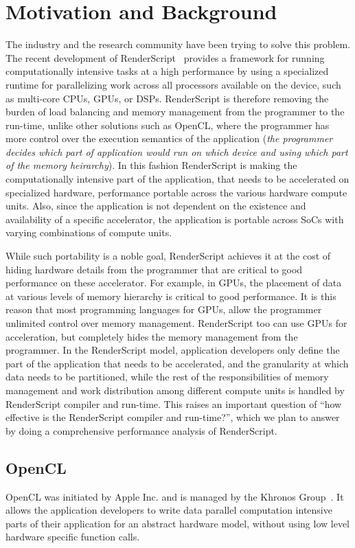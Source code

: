 \section{Motivation and Background}
The industry and the research community have been trying to solve this problem.
The recent development of RenderScript~\cite{wiki:RenderScript, RenderScript}
provides a framework
for running computationally intensive tasks at a high performance by using a
specialized runtime for 
parallelizing work across all processors available on the device, such as
multi-core CPUs, GPUs, or DSPs. RenderScript is therefore removing the
burden of load balancing and memory management from the programmer to the run-time, unlike other
solutions such as OpenCL, where the programmer has more control over the
execution semantics of the application ({\em the programmer decides which part
of application would run on which device and using which part of the memory heirarchy}).
In this fashion RenderScript is
making the computationally intensive part of the application, that needs to be
accelerated on specialized hardware, performance portable across the various hardware compute
units. Also, since the application is not dependent on the existence and
availability of a specific accelerator, the application is portable across SoCs
with varying combinations of compute units.

While such portability is a noble goal, RenderScript achieves it at the cost of
hiding hardware details from the programmer that are critical to good
performance on these accelerator. For example, in GPUs, the placement of data at
various levels of memory hierarchy is critical to good performance.
It is this reason that most programming languages for GPUs, allow the programmer
unlimited control over memory management. RenderScript too can use GPUs for acceleration, but
completely hides the memory management from the programmer. In the RenderScript
model, application developers only define the part of the application that needs
to be accelerated, and the granularity at which data needs to be partitioned,
while the rest of the responsibilities of memory management and work distribution
among different compute units is handled by RenderScript compiler and run-time.
This raises an important
question of ``how effective is the RenderScript compiler and run-time?'', which
we plan to answer by doing a comprehensive performance analysis of RenderScript.
\subsection{OpenCL}
OpenCL was initiated by Apple Inc. and is managed by the Khronos
Group~\cite{Khronos:url}. It allows the application developers to write
data parallel computation intensive parts of their application for an abstract
hardware model, without using low level hardware specific function calls.

